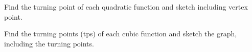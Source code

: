 \documentclass[12pt, a4paper, addpoints]{exam}
\newcommand{\ts}{\vspace{6 mm}}
\newcommand{\ms}{\vspace{11 mm}}
\newcommand{\plotquadratic}[4]{%
\begin{tikzpicture}
    \begin{axis}[
        axis lines = middle,
        xlabel = $x$, ylabel = $y$,
        grid = both,
        width=8cm, height=6cm,
        xmin=-6, xmax=6, ymin=-10, ymax=10,
        samples=100
    ]
    \addplot [domain=-6:6, thick, color=blue] {#1*(x - #2)^2 + #3};
    \node at (axis cs:#2,#3)[pin=above:{Turning Point: (#2,#3)}] {};
    \end{axis}
\end{tikzpicture}
}
\begin{document}
\begin{questions}
\begin{multicols}{2}
\end{multicols}
\ts

\question Find the turning point of each quadratic function and sketch including vertex point.

\begin{multicols}{3}
\end{multicols}
\ts

\question Find the turning points (tps) of each cubic function and sketch the graph, including the turning points.


\begin{parts}\Large

\end{parts}
\end{questions}
\end{document}
